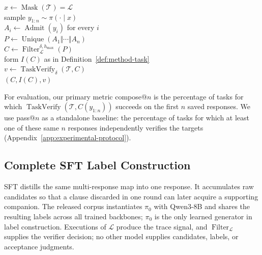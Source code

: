 \begin{algorithm}[H]
\caption{CRAFT inference}
\label{alg:rcf}
\begin{algorithmic}
\algline \(x\leftarrow\operatorname{Mask}(\mathcal T)=\mathcal L\)\\
\algline sample \(y_{1:n}\sim\pi(\cdot\mid x)\)\\
\algline \(A_i\leftarrow\operatorname{Admit}(y_i)\) for every \(i\)\\
\algline \(P\leftarrow\operatorname{Unique}(A_1\Vert\cdots\Vert A_n)\)\\
\algline \(C\leftarrow\operatorname{Filter}_{\mathcal L}^{\delta,h_{\max}}(P)\)\\
\algline form \(I(C)\) as in Definition~\ref{def:method-task}\\
\algline \(v\leftarrow\operatorname{TaskVerify}_{\delta}(\mathcal T,C)\)\\
\algline {} \((C,I(C),v)\)\\
\end{algorithmic}
\end{algorithm}

For evaluation, our primary metric compose@\(n\) is the percentage of tasks for which
\(\operatorname{TaskVerify}(\mathcal T,C(y_{1:n}))\) succeeds on the first
\(n\) saved responses. We use pass@\(n\) as a standalone baseline: the
percentage of tasks for which at least one of these same \(n\) responses
independently verifies the targets
(Appendix~\ref{app:experimental-protocol}).

\subsection{Complete SFT Label Construction}

SFT distills the same multi-response map into one response.  It accumulates
raw candidates so that a clause discarded in one round can later acquire a
supporting companion.  The released corpus instantiates \(\pi_0\) with
Qwen3-8B and shares the resulting labels across all trained backbones;
\(\pi_0\) is the only learned generator in label construction.
Executions of \(\mathcal L\) produce the trace signal, and
\(\operatorname{Filter}_{\mathcal L}\) supplies the verifier decision; no
other model supplies candidates, labels, or acceptance judgments.

